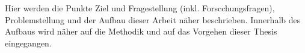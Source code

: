 Hier werden die Punkte Ziel und Fragestellung (inkl. Forscchungsfragen), Problemstellung und der Aufbau dieser Arbeit näher beschrieben. Innerhalb des Aufbaus wird näher auf die Methodik und auf das Vorgehen dieser Thesis eingegangen.